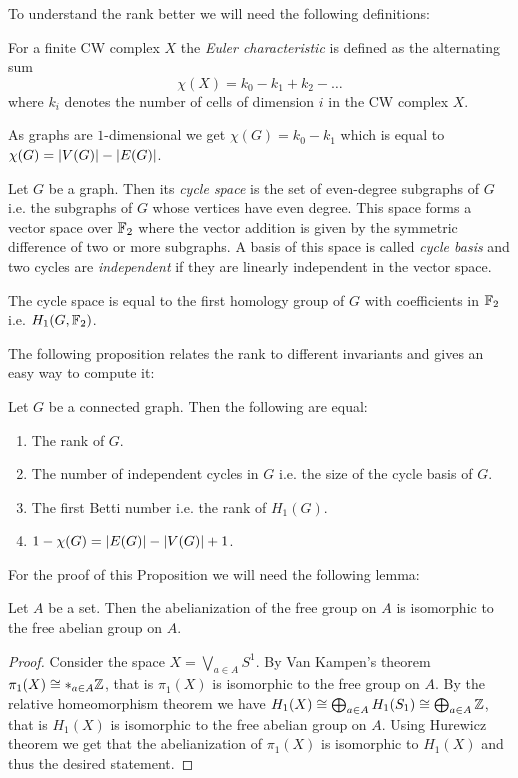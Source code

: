 To understand the rank better we will need the following definitions:
\begin{definition}
	For a finite CW complex $X$ the \emph{Euler characteristic} is defined as the alternating sum
	\[
		\chi(X) = k_0 - k_1 + k_2 - \ldots
	\] 
	where $k_{i}$ denotes the number of cells of dimension $i$ in the CW complex $X$.
\end{definition}
As graphs are $1$-dimensional we get $\chi (G) = k_0 - k_1$ which is equal to $\chi(G) = \abs{V(G)} - \abs{E(G)}$.

\begin{definition}
	Let $G$ be a graph. Then its \emph{cycle space} is the set of even-degree subgraphs of $G$ i.e. the subgraphs of $G$ whose vertices have even degree. 
	This space forms a vector space over $\mathbb{F}_2$ where the vector addition is given by the symmetric difference of two or more subgraphs.
	A basis of this space is called \emph{cycle basis} and two cycles are \emph{independent} if they are linearly independent in the vector space.
\end{definition}

\begin{remark}
	The cycle space is equal to the first homology group of $G$ with coefficients in $\mathbb{F}_2$ i.e. $H_1(G,\mathbb{F}_2)$.
\end{remark}

The following proposition relates the rank to different invariants and gives an easy way to compute it: 
\begin{proposition}\label{prop:rank}
	Let $G$ be a connected graph. Then the following are equal:
	\begin{enumerate}
		\item The rank of $G$.
		\item The number of independent cycles in $G$ i.e. the size of the cycle basis of $G$.
		\item The first Betti number i.e. the rank of $H_{1}(G)$.
		\item $1 - \chi(G) = \abs{E(G)} - \abs{V(G)} + 1$.
	\end{enumerate}
\end{proposition}

For the proof of this Proposition we will need the following lemma:
\begin{lemma}
	Let $A$ be a set. Then the abelianization of the free group on $A$ is isomorphic to the free abelian group on $A$.
\end{lemma}

\begin{proof}
	Consider the space $X = \bigvee_{a \in A} S^{1}$. By Van Kampen's theorem $\pi_1(X) \cong *_{a \in A} \mathbb{Z}$, that is $\pi_1(X)$ is isomorphic to the free group on $A$.
	By the relative homeomorphism theorem we have $H_1(X) \cong \bigoplus_{a \in A} H_1(S_1) \cong \bigoplus_{a \in A} \mathbb{Z}$,
	that is $H_1(X)$ is isomorphic to the free abelian group on $A$.
	Using Hurewicz theorem we get that the abelianization of $\pi_1(X)$ is isomorphic to $H_1(X)$ and thus the desired statement.
\end{proof}

